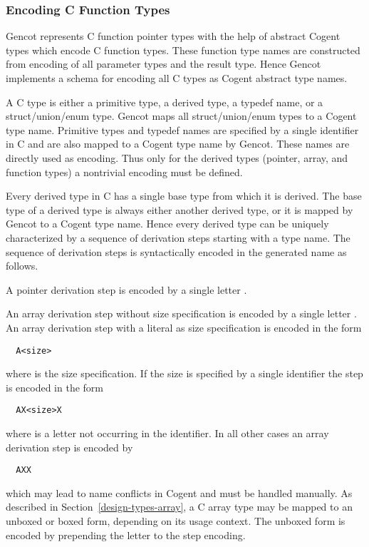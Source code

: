 \subsubsection{Encoding C Function Types}

Gencot represents C function pointer types with the help of abstract Cogent types which encode C function types. These
function type names are constructed from encoding of all parameter types and the result type. Hence Gencot implements
a schema for encoding all C types as Cogent abstract type names.

A C type is either a primitive type, a derived type, a typedef name, or a struct/union/enum type. Gencot maps all
struct/union/enum types to a Cogent type name. Primitive types and typedef names are specified by a single identifier
in C and are also mapped to a Cogent type name by Gencot. These names are directly used as encoding. Thus only for the 
derived types (pointer, array, and function types) a nontrivial encoding must be defined.

Every derived type in C has a single base type from which it is derived. The base type of a derived
type is always either another derived type, or it is mapped by Gencot to a Cogent type name. Hence every derived 
type can be uniquely characterized by a sequence of derivation steps starting with a type name. The sequence of 
derivation steps is syntactically encoded in the generated name as follows.

A pointer derivation step is encoded by a single letter . 

An array derivation step without size
specification is encoded by a single letter . An array derivation step with a literal
as size specification is encoded in the form
\begin{verbatim}
  A<size>
\end{verbatim}
where  is the size specification. If the size is specified by a single identifier the 
step is encoded in the form
\begin{verbatim}
  AX<size>X
\end{verbatim}
where  is a letter not occurring in the identifier.
In all other cases an array derivation step is encoded by
\begin{verbatim}
  AXX
\end{verbatim}
which may lead to name conflicts in Cogent and must be handled manually. As described in 
Section~\ref{design-types-array}, a C array type may be mapped to an unboxed or boxed form, depending
on its usage context. The unboxed form is encoded by prepending the letter  to the step
encoding.

